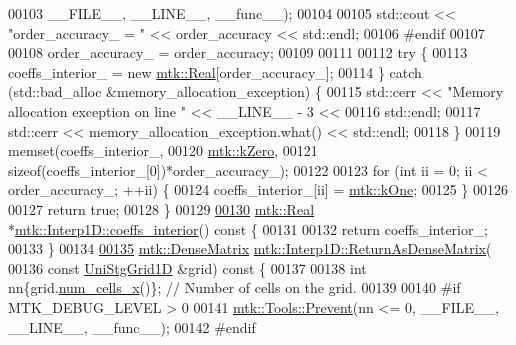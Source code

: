 \begin{DoxyCode}
00103                       \_\_FILE\_\_, \_\_LINE\_\_, \_\_func\_\_);
00104 
00105   std::cout << \textcolor{stringliteral}{"order\_accuracy\_ = "} << order\_accuracy << std::endl;
00106 \textcolor{preprocessor}{  #endif}
00107 
00108   order\_accuracy\_ = order\_accuracy;
00109 
00111 
00112   \textcolor{keywordflow}{try} \{
00113     coeffs\_interior\_ = \textcolor{keyword}{new} \hyperlink{group__c01-roots_gac080bbbf5cbb5502c9f00405f894857d}{mtk::Real}[order\_accuracy\_];
00114   \} \textcolor{keywordflow}{catch} (std::bad\_alloc &memory\_allocation\_exception) \{
00115     std::cerr << \textcolor{stringliteral}{"Memory allocation exception on line "} << \_\_LINE\_\_ - 3 <<
00116       std::endl;
00117     std::cerr << memory\_allocation\_exception.what() << std::endl;
00118   \}
00119   memset(coeffs\_interior\_,
00120          \hyperlink{group__c01-roots_ga59a451a5fae30d59649bcda274fea271}{mtk::kZero},
00121          \textcolor{keyword}{sizeof}(coeffs\_interior\_[0])*order\_accuracy\_);
00122 
00123   \textcolor{keywordflow}{for} (\textcolor{keywordtype}{int} ii = 0; ii < order\_accuracy\_; ++ii) \{
00124     coeffs\_interior\_[ii] = \hyperlink{group__c01-roots_ga26407c24d43b6b95480943340d285c71}{mtk::kOne};
00125   \}
00126 
00127   \textcolor{keywordflow}{return} \textcolor{keyword}{true};
00128 \}
00129 
\hypertarget{mtk__interp__1d_8cc_source_l00130}{}\hyperlink{classmtk_1_1Interp1D_a652289cbb0000d3f4e5e8d632aaf4b03}{00130} \hyperlink{group__c01-roots_gac080bbbf5cbb5502c9f00405f894857d}{mtk::Real} *\hyperlink{classmtk_1_1Interp1D_a652289cbb0000d3f4e5e8d632aaf4b03}{mtk::Interp1D::coeffs\_interior}()\textcolor{keyword}{ const }\{
00131 
00132   \textcolor{keywordflow}{return} coeffs\_interior\_;
00133 \}
00134 
\hypertarget{mtk__interp__1d_8cc_source_l00135}{}\hyperlink{classmtk_1_1Interp1D_aee8126b8a4be378a30be4d95b43b384b}{00135} \hyperlink{classmtk_1_1DenseMatrix}{mtk::DenseMatrix} \hyperlink{classmtk_1_1Interp1D_aee8126b8a4be378a30be4d95b43b384b}{mtk::Interp1D::ReturnAsDenseMatrix}(
00136   \textcolor{keyword}{const} \hyperlink{classmtk_1_1UniStgGrid1D}{UniStgGrid1D} &grid)\textcolor{keyword}{ const }\{
00137 
00138   \textcolor{keywordtype}{int} nn\{grid.\hyperlink{classmtk_1_1UniStgGrid1D_af1b3729d8afa07be5b2775ed68015b80}{num\_cells\_x}()\}; \textcolor{comment}{// Number of cells on the grid.}
00139 
00140 \textcolor{preprocessor}{  #if MTK\_DEBUG\_LEVEL > 0}
00141   \hyperlink{classmtk_1_1Tools_a332324c6f25e66be9dff48c5987a3b9f}{mtk::Tools::Prevent}(nn <= 0, \_\_FILE\_\_, \_\_LINE\_\_, \_\_func\_\_);
00142 \textcolor{preprocessor}{  #endif}

\end{DoxyCode}
